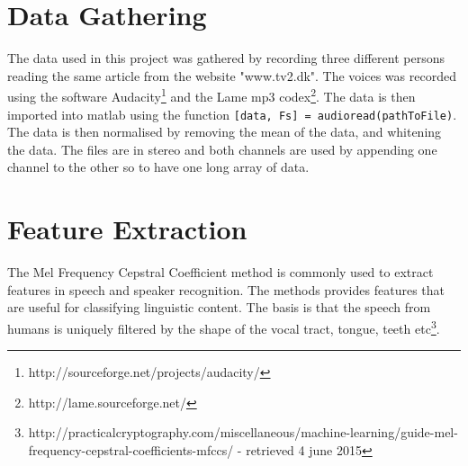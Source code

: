 \section{Data Gathering}
The data used in this project was gathered by recording three different persons reading the same article from the website "www.tv2.dk". The voices was recorded using the software Audacity\footnote{http://sourceforge.net/projects/audacity/} and the Lame mp3 codex\footnote{http://lame.sourceforge.net/}. The data is then imported into matlab using the function \texttt{[data, Fs] = audioread(pathToFile)}. The data is then normalised by removing the mean of the data, and whitening the data. The files are in stereo and both channels are used by appending one channel to the other so to have one long array of data.

\section{Feature Extraction}
The Mel Frequency Cepstral Coefficient method is commonly used to extract features in speech and speaker recognition. The methods provides features that are useful for classifying linguistic content. The basis is that the speech from humans is uniquely filtered by the shape of the vocal tract, tongue, teeth etc\footnote{http://practicalcryptography.com/miscellaneous/machine-learning/guide-mel-frequency-cepstral-coefficients-mfccs/ - retrieved 4 june 2015}. 

